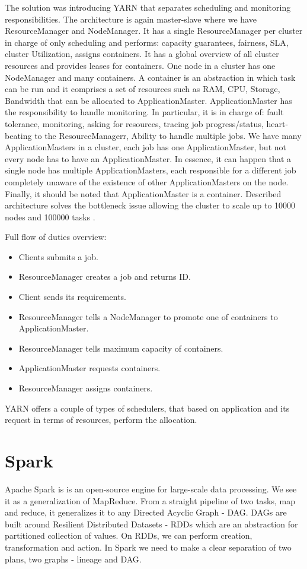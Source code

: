 The solution was introducing YARN that separates scheduling and monitoring responsibilities. The architecture is again master-slave where we have ResourceManager and NodeManager. It has a single ResourceManager per cluster in charge of only scheduling and performs: capacity guarantees, fairness, SLA, cluster Utilization, assigns containers. It has a global overview of all cluster resources and provides leases for containers. One node in a cluster has one NodeManager and many containers. A container is an abstraction in which task can be run and it comprises a set of resources such as RAM, CPU, Storage, Bandwidth that can be allocated to ApplicationMaster. ApplicationMaster has the responsibility to handle monitoring. In particular, it is in charge of: fault tolerance, monitoring, asking for resources, tracing job progress/status, heart-beating to the ResourceManagerr, Ability to handle multiple jobs. We have many ApplicationMasters in a cluster, each job has one ApplicationMaster, but not every node has to have an ApplicationMaster. In essence, it can happen that a single node has multiple ApplicationMasters, each responsible for a different job completely unaware of the existence of other ApplicationMasters on the node. Finally, it should be noted that ApplicationMaster is a container. Described architecture solves the bottleneck issue allowing the cluster to scale up to 10000 nodes and 100000 tasks \cite{BigDataCourse}. %

Full flow of duties overview:
\begin{itemize}
	\item Clients submits a job. 
	\item ResourceManager creates a job and returns ID. \item Client sends its requirements. 
	\item ResourceManager tells a NodeManager to promote one of containers to ApplicationMaster. 
	\item ResourceManager tells maximum capacity of containers. 
	\item ApplicationMaster requests containers. 
	\item ResourceManager assigns containers.
\end{itemize}


YARN offers a couple of types of schedulers, that based on application and its request in terms of resources, perform the allocation.

\section{Spark}
Apache Spark \cite{ApacheSpark} \cite{SparkDefinitiveGuide} \cite{LearningSpark} is is an open-source engine for large-scale data processing. We see it as a generalization of MapReduce. From a straight pipeline of two tasks, map and reduce, it generalizes it to any Directed Acyclic Graph - DAG. DAGs are built around Resilient Distributed Datasets - RDDs \cite{RDD} which are an abstraction for partitioned collection of values. On RDDs, we can perform creation, transformation and action. In Spark we need to make a clear separation of two plans, two graphs - lineage and DAG.

